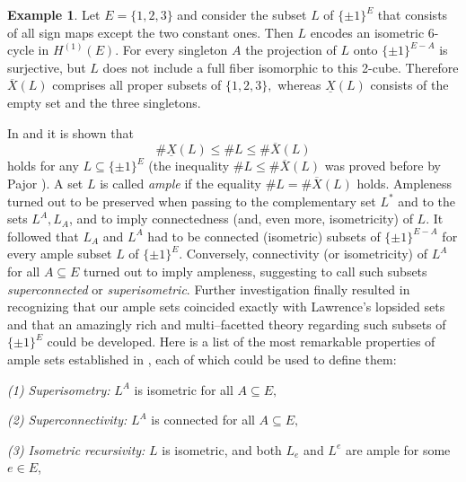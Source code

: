 \documentclass[11pt,a4paper]{amsart}
\theoremstyle{definition}
\newtheorem{example}{Example}
\numberwithin{equation}{section}
\newcommand{\covectors}{\ensuremath{L}}
\newcommand{\X}{\ensuremath{X}}
\newcommand{\HH}{\ensuremath{H}}
\begin{document}
\begin{example}\label{example1}
Let $E=\{ 1,2,3\}$ and consider the subset $\covectors$ of $\{ \pm 1\}^{E}$ that consists
of all sign maps except the two constant ones. Then $\covectors$ encodes an
isometric 6-cycle in $\HH^{(1)}(E).$ For every singleton $A$ the projection of $\covectors$
onto $\{ \pm 1\}^{E-A}$ is surjective, but $\covectors$ does not include a full fiber isomorphic to this 2-cube.
Therefore $\overline{{\X}}({\covectors})$ comprises all proper subsets of $\{ 1,2,3\},$ whereas
$\underline{{\X}}({\covectors})$ consists
of the empty set and the three singletons.
\end{example}

In \cite{Dr} and \cite{BaChDrKo}  it is shown that
$$\#\underline{{\X}}({\covectors})\le \#{\covectors}\le \#\overline{{\X}}({\covectors})$$
holds for any $\covectors\subseteq \{ \pm 1\}^E$ (the inequality $\#{\covectors}\le \#\overline{{\X}}({\covectors})$ was proved before by Pajor \cite{Pa}). %
A set $\covectors$ is called {\it ample} if the equality
$\#{\covectors}=\#\overline{{\X}}({\covectors})$ holds.  Ampleness
turned out to be preserved when passing to the complementary set ${\covectors}^*$ and to
the sets ${\covectors}^A, {\covectors}_A$, and to imply connectedness (and, even more,
isometricity) of $L$. %
It followed that ${\covectors}_A$ and ${\covectors}^A$ had to be connected (isometric) subsets of $\{\pm 1\}^{E-A}$
for every ample subset ${\covectors}$ of $\{ \pm 1\}^E$. Conversely,
connectivity (or isometricity) of ${\covectors}^A$ for all $A\subseteq
E$ turned out to imply ampleness, suggesting to call such subsets
{\it superconnected} or {\it superisometric}. Further
investigation finally resulted in recognizing that our ample sets
coincided exactly with Lawrence's lopsided sets and that an
amazingly rich and multi--facetted theory regarding such subsets
of $\{ \pm 1\}^E$ could be developed. Here is a list of the most  remarkable
properties of ample sets established in \cite{BaChDrKo}, each of which could
be used to define them:

\medskip\noindent
{\it {\rm(1)} Superisometry:} ${\covectors}^A$ is isometric for all $A\subseteq
E,$

\medskip\noindent
{\it {\rm(2)} Superconnectivity:} ${\covectors}^A$ is connected for all
$A\subseteq E,$

\medskip\noindent
{\it {\rm(3)} Isometric recursivity:} ${\covectors}$ is isometric, and both
${\covectors}_e$ and ${\covectors}^e$ are ample for some $e\in E$,
\end{document}
